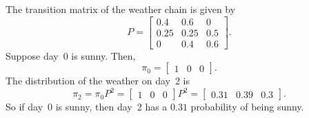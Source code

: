 \begin{example}
\label{ex:A.6}
The transition matrix of the weather chain is given by
\[
  P = \begin{bmatrix} 0.4 & 0.6 & 0 \\ 0.25 & 0.25 & 0.5 \\ 0 & 0.4 & 0.6 \end{bmatrix}.
\]
Suppose day~0 is sunny.  Then,
\[
  \pi_0 = \begin{bmatrix} 1 & 0 & 0 \end{bmatrix}.
\]
The distribution of the weather on day~2 is
\[
  \pi_2 = \pi_0 P^2 = \begin{bmatrix} 1 & 0 & 0 \end{bmatrix} P^2
         = \begin{bmatrix} 0.31 & 0.39 & 0.3 \end{bmatrix}.
\]
So if day~0 is sunny, then day~2 has a $0.31$ probability of being sunny.
\end{example}
